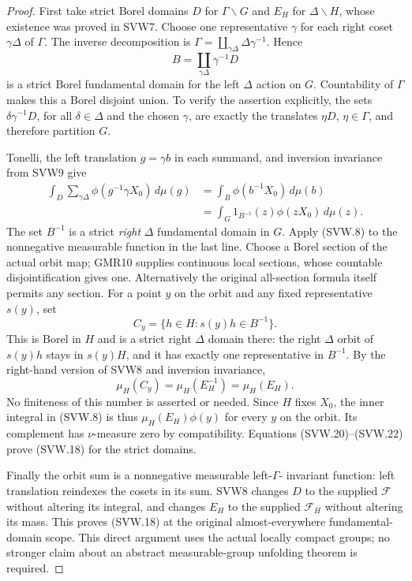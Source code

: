 \begin{proof}
First take strict Borel domains $D$ for $\Gamma\backslash G$ and
$E_H$ for $\Delta\backslash H$, whose existence was proved in
SVW7.  Choose one representative $\gamma$ for each right coset
$\gamma\Delta$ of $\Gamma$.  The inverse decomposition is
$\Gamma=\coprod_{\gamma\Delta}\Delta\gamma^{-1}$.  Hence
\[
          B=\coprod_{\gamma\Delta}\gamma^{-1}D
 \tag{SVW.19}
\]
is a strict Borel fundamental domain for the left $\Delta$ action
on $G$.  Countability of $\Gamma$ makes this a Borel disjoint union.
To verify the assertion explicitly, the sets
$\delta\gamma^{-1}D$, for all $\delta\in\Delta$ and the chosen
$\gamma$, are exactly the translates $\eta D$, $\eta\in\Gamma$,
and therefore partition $G$.

Tonelli, the left translation $g=\gamma b$ in each summand, and
inversion invariance from SVW9 give
\[
 \begin{split}
 \int_D\sum_{\gamma\Delta}\phi(g^{-1}\gamma X_0)\,d\mu(g)
     &=\int_B\phi(b^{-1}X_0)\,d\mu(b)\\
     &=\int_G1_{B^{-1}}(z)\phi(zX_0)\,d\mu(z).
 \end{split}
 \tag{SVW.20}
\]
The set $B^{-1}$ is a strict \emph{right} $\Delta$ fundamental
domain in $G$.  Apply (SVW.8) to the nonnegative measurable function
in the last line.  Choose a Borel section of the actual orbit map;
GMR10 supplies continuous local sections, whose countable
disjointification gives one.  Alternatively the original
all-section formula itself permits any section.  For a point $y$
on the orbit and any fixed representative $s(y)$, set
\[
            C_y=\{h\in H:s(y)h\in B^{-1}\}.
 \tag{SVW.21}
\]
This is Borel in $H$ and is a strict right $\Delta$ domain there:
the right $\Delta$ orbit of $s(y)h$ stays in $s(y)H$, and it has
exactly one representative in $B^{-1}$.  By the right-hand version
of SVW8 and inversion invariance,
\[
             \mu_H(C_y)=\mu_H(E_H^{-1})=\mu_H(E_H).
 \tag{SVW.22}
\]
No finiteness of this number is asserted or needed.  Since $H$
fixes $X_0$, the inner integral in (SVW.8) is thus
$\mu_H(E_H)\phi(y)$ for every $y$ on the orbit.  Its complement
has $\nu$-measure zero by compatibility.  Equations
(SVW.20)--(SVW.22) prove (SVW.18) for the strict domains.

Finally the orbit sum is a nonnegative measurable left-$\Gamma$-
invariant function: left translation reindexes the cosets in its
sum.  SVW8 changes $D$ to the supplied $\mathcal F$ without altering
its integral, and changes $E_H$ to the supplied $\mathcal F_H$
without altering its mass.  This proves (SVW.18) at the original
almost-everywhere fundamental-domain scope.  This direct argument
uses the actual locally compact groups; no stronger claim about
an abstract measurable-group unfolding theorem is required.
\end{proof}

